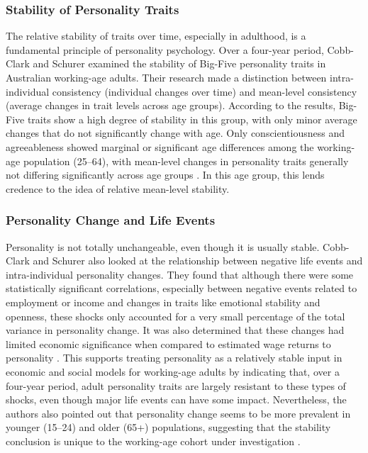 \documentclass{DESSThesis}
\begin{document}
\subsubsection{Stability of Personality Traits}
The relative stability of traits over time, especially in adulthood, is a fundamental principle of personality psychology. Over a four-year period, Cobb-Clark and Schurer examined the stability of Big-Five personality traits in Australian working-age adults. Their research made a distinction between intra-individual consistency (individual changes over time) and mean-level consistency (average changes in trait levels across age groups). According to the results, Big-Five traits show a high degree of stability in this group, with only minor average changes that do not significantly change with age. Only conscientiousness and agreeableness showed marginal or significant age differences among the working-age population (25–64), with mean-level changes in personality traits generally not differing significantly across age groups \cite{cobb-clark_stability_2012}. In this age group, this lends credence to the idea of relative mean-level stability.

\subsubsection{Personality Change and Life Events}
Personality is not totally unchangeable, even though it is usually stable. Cobb-Clark and Schurer also looked at the relationship between negative life events and intra-individual personality changes. They found that although there were some statistically significant correlations, especially between negative events related to employment or income and changes in traits like emotional stability and openness, these shocks only accounted for a very small percentage of the total variance in personality change. It was also determined that these changes had limited economic significance when compared to estimated wage returns to personality \cite{cobb-clark_stability_2012}. This supports treating personality as a relatively stable input in economic and social models for working-age adults by indicating that, over a four-year period, adult personality traits are largely resistant to these types of shocks, even though major life events can have some impact. Nevertheless, the authors also pointed out that personality change seems to be more prevalent in younger (15–24) and older (65+) populations, suggesting that the stability conclusion is unique to the working-age cohort under investigation \cite{cobb-clark_stability_2012}.
\end{document}
